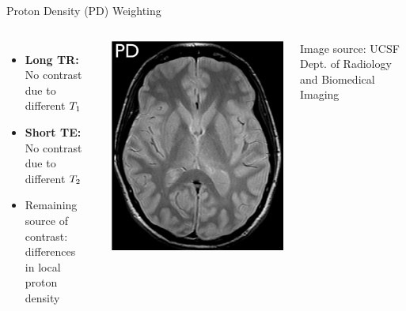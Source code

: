 \begin{frame}{Proton Density (PD) Weighting}

    \begin{columns}[t,onlytextwidth]
        

        \begin{itemize}
            \item \textbf{Long TR:} No contrast due to different $T_1$
            \item \textbf{Short TE:} No contrast due to different $T_2$
            \item Remaining source of contrast: differences \\ in local proton density
        \end{itemize}

        \includegraphics[height=0.6\textheight]{images/pd}

        {\scriptsize Image source: UCSF Dept. of Radiology and Biomedical Imaging}
    \end{columns}
\end{frame}

